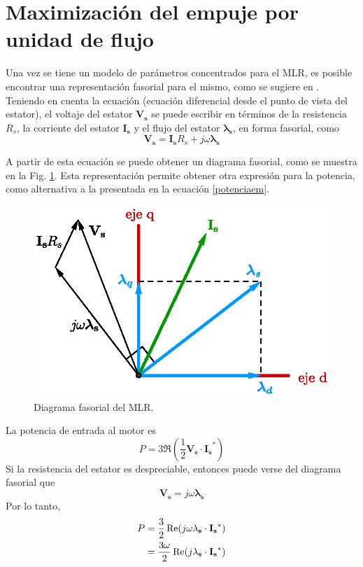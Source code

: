 \section{Maximización del empuje por unidad de flujo}
Una vez se tiene un modelo de parámetros concentrados para el MLR, es posible encontrar una representación fasorial para el mismo, como se sugiere en \cite{boldea2013}. Teniendo en cuenta la ecuación (ecuación diferencial desde el punto de vista del estator), el voltaje del estator $\mathbf{V_s}$ se puede escribir en términos de la resistencia $R_s$, la corriente del estator $\mathbf{I_s}$ y el flujo del estator $\mathbf{\lambda_s}$, en forma fasorial, como
\begin{equation}
\mathbf{V_s} = \mathbf{I_s} R_s + j\omega \mathbf{\lambda_s}
\end{equation}

A partir de esta ecuación se puede obtener un diagrama fasorial, como se muestra en la Fig. \ref{fig:phasordiag}. Esta representación permite obtener otra expresión para la potencia, como alternativa a la presentada en la ecuación \ref{potenciaem}.

\begin{figure}[ht]
\centering
\includegraphics[scale=0.7]{../img/Teoria_del_MLR/phasordiag.eps}
\caption{Diagrama fasorial del MLR.}
\label{fig:phasordiag}
\end{figure}

La potencia de entrada al motor es
\begin{equation}
P = 3\Re\left(\frac{1}{2}\mathbf{V_s}\cdot\mathbf{I_s}^*\right)
\end{equation}
Si la resistencia del estator es despreciable, entonces puede verse del diagrama fasorial que
\begin{equation}
\mathbf{V_s} = j\omega\mathbf{\lambda_s}
\end{equation}
Por lo tanto,
\begin{align}
P &= \frac{3}{2}\Re(j\omega\mathbf{\lambda_s}\cdot\mathbf{I_s}^*)\notag\\
&= \frac{3\omega}{2}\Re(j\mathbf{\lambda_s}\cdot\mathbf{I_s}^*)
\end{align}

